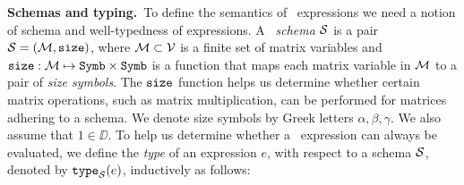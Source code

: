 \smallskip
\noindent
\textbf{Schemas and typing.}\,
To define the semantics of \lang\ expressions we need a notion of schema and well-typedness of expressions. A \lang\ \textit{schema} $\mathcal{S}$ is a pair $\mathcal{S}=(\mathcal{M},\texttt{size})$, where $\mathcal{M}\subset \mathcal{V}$ is a finite set of matrix variables and $\texttt{size}: \mathcal{M} \mapsto \texttt{Symb}\times \texttt{Symb}$ is a function that maps each matrix variable in $\mathcal{M}$ to a pair of \textit{size symbols}. The $\texttt{size}$ function helps us determine whether certain matrix operations, such as matrix multiplication, can be performed for matrices adhering to a schema. 
We denote size symbols by Greek letters $\alpha,\beta,\gamma$. We also assume that $1\in \DD$. To help us determine whether a \lang\ expression can always be evaluated, we define the \textit{type} of an expression $e$, with respect to a schema $\mathcal{S}$, denoted by $\texttt{type}_{\mathcal{S}}(e)$, inductively as follows:
